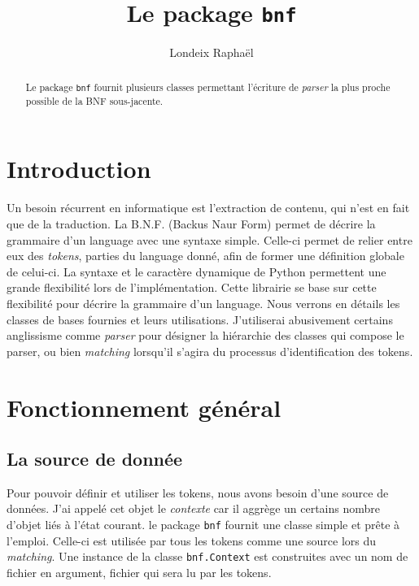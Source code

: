 \documentclass[a4paper]{article}
\title{Le package \texttt{bnf}}
\author{Londeix Raphaël}
\newcommand{\fixed}[1]{\texttt{#1}}
\newcommand{\bnf}{B.N.F. }
\begin{document}
    \maketitle

    \begin{abstract}
        Le package \fixed{bnf} fournit plusieurs classes permettant
        l'écriture de \textit{parser} la plus proche possible de la
        BNF sous-jacente.
    \end{abstract}

    \newpage
    \section{Introduction}
        Un besoin récurrent en informatique est l'extraction de contenu,
        qui n'est en fait que de la traduction. La \bnf (Backus Naur Form)
        permet de décrire la grammaire d'un language avec une syntaxe simple.
        Celle-ci permet de relier entre eux des \textit{tokens},
        parties du language donné, afin de former une définition globale
        de celui-ci. La syntaxe et le caractère dynamique de Python permettent
        une grande flexibilité lors de l'implémentation. Cette librairie se
        base sur cette flexibilité pour décrire la grammaire d'un language.
        Nous verrons en détails les classes de bases fournies et leurs
        utilisations. J'utiliserai
        abusivement certains anglissisme comme \emph{parser} pour désigner
        la hiérarchie des classes qui compose le parser, ou bien \emph{matching}
        lorsqu'il s'agira du processus d'identification des tokens.

    \newpage
    \section{Fonctionnement général}
        \subsection{La source de donnée}
            Pour pouvoir définir et utiliser les tokens, nous avons besoin d'une
            source de données. J'ai appelé cet objet le \emph{contexte} car
            il aggrège un certains nombre d'objet liés à l'état courant. le
            package \fixed{bnf} fournit une classe simple et prête à l'emploi.
            Celle-ci est utilisée par tous les tokens comme une source lors
            du \textit{matching}. Une instance de la classe \fixed{bnf.Context} est
            construites avec un nom de fichier en argument, fichier qui sera
            lu par les tokens.
\end{document}
